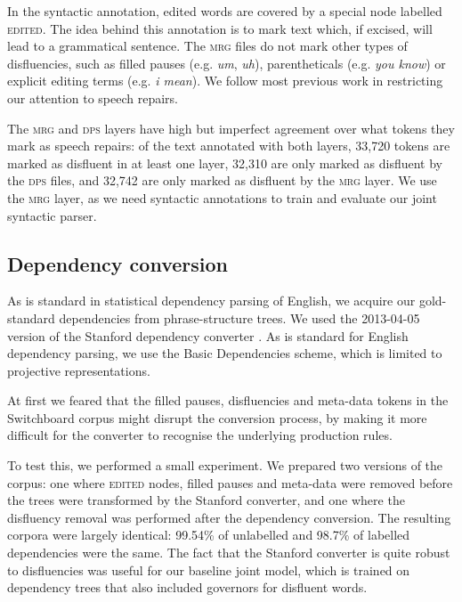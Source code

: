 \documentclass[11pt,letterpaper]{article}
\begin{document}
In the syntactic annotation, edited words are covered by a special node labelled
\textsc{edited}.
The idea behind this annotation is to mark text which, if
excised, will lead to a grammatical sentence.  The \textsc{mrg} files do not
mark other types of disfluencies, such as filled pauses (e.g. \emph{um}, \emph{uh}),
parentheticals (e.g. \emph{you know}) or explicit editing terms (e.g. \emph{i mean}).
We follow most previous work in restricting our attention to speech repairs.

The \textsc{mrg} and \textsc{dps} layers have high but imperfect agreement over
what tokens they mark as speech repairs: of the text annotated with both layers,
33,720 tokens are marked as disfluent in at least one layer, 32,310 are only marked
as disfluent by the \textsc{dps} files, and 32,742 are only marked as disfluent
by the \textsc{mrg} layer.
We use the \textsc{mrg} layer, as we need syntactic annotations to train and
evaluate our joint syntactic parser.

\subsection{Dependency conversion}

\label{sec:deps}
As is standard in statistical dependency parsing of English, we acquire our
gold-standard dependencies from phrase-structure trees.
We used the 2013-04-05 version of the Stanford dependency converter \citep{stanford_deps}.
As is standard for English dependency parsing, we use the Basic Dependencies scheme,
which is limited to projective representations.

At first we feared that the filled pauses, disfluencies and meta-data tokens in
the Switchboard corpus might disrupt the conversion process, by making it more
difficult for the converter to recognise the underlying production rules.

To test this, we performed a small experiment. We prepared two versions of the corpus:
one where \textsc{edited} nodes, filled pauses and meta-data were removed before
the trees were transformed by the Stanford converter, and one where the disfluency
removal was performed after the dependency conversion. The resulting corpora
were largely identical: 99.54\% of unlabelled and 98.7\% of labelled dependencies
were the same. The fact that the Stanford converter is quite robust to disfluencies
was useful for our baseline joint model, which is
trained on dependency trees that also included governors for disfluent words.
\end{document}
